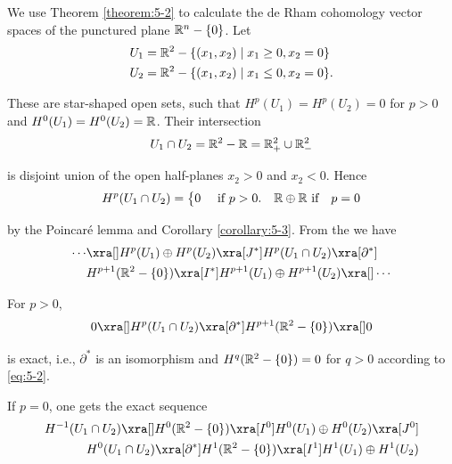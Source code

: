 \begin{example}\label{example:5-4}
  We use Theorem \ref{theorem:5-2} to calculate the de Rham cohomology vector spaces of the punctured plane ${\mathbb{R}}^n-\{0\}$. Let 
  \begin{align*}
    U_{1} & = {\mathbb{R}}^2-\{(x_1,x_2)\mid x_1\geq0, x_2=0\}\\
    U_{2} & = {\mathbb{R}}^2-\{(x_1,x_2)\mid x_1\leq0, x_2=0\}.
  \end{align*}

  These are star-shaped open sets, such that $H^p(U_1) = H^p(U_2) = 0$ for $p>0$ and $H^0(U_1) = H^0(U_2) = {\mathbb{R}}$. 
  Their intersection 
  \begin{align*}
    U_1\cap U_2 = {\mathbb{R}}^2-{\mathbb{R}} = {\mathbb{R}}^2_+\cup {\ensuremath{\mathbb{R}}}^2_-
  \end{align*}

  is disjoint union of the open half-planes $x_2>0$ and $x_2<0$. Hence 
  \begin{align}\label{eq:5-2}
    H^p(U_1\cap U_2) = \left\{\begin{aligned}
      & 0 && \text{ if } p>0.
      & {\mathbb{R}}\oplus{\ensuremath{\mathbb{R}}} \text{ if} && p = 0
    \end{aligned}\right.
  \end{align}

  by the Poincar\'e lemma and Corollary \ref{corollary:5-3}. From the  we have
  \begin{align*}
    \cdots  & \xra[] H^p(U_1)\oplus H^p(U_2)\xra[J^*]H^p(U_1\cap U_2)\xra[\partial^*]\\
            & H^{p+1}(\RR^2-\{0\})\xra[I^*] H^{p+1}(U_1)\oplus H^{p+1}(U_2)\xra[]\cdots
  \end{align*}
\end{example}

For $p>0$, 
\begin{align*}
  0\xra[] H^p(U_1\cap U_2)\xra[\partial^*] H^{p+1}(\RR^2-\{0\})\xra[] 0
\end{align*}

is exact, i.e., $\partial^*$ is an isomorphism and $H^q({\mathbb{R}}^2-\{0\}) = 0$ for $q>0$ according 
to \eqref{eq:5-2}.

If $p=0$, one gets the exact sequence
\begin{align}\label{eq:5-3}
\begin{aligned}
  H^{-1}(U_1\cap U_2)\xra[] H^0(\RR^2-\{0\}) \xra[I^0] H^0(U_1)\oplus H^0(U_2)\xra[J^0] \\
  H^0(U_1\cap U_2)\xra[\partial^*] H^1(\RR^2-\{0\}) \xra[I^1]H^1(U_1)\oplus H^1(U_2)
\end{aligned}
\end{align}

